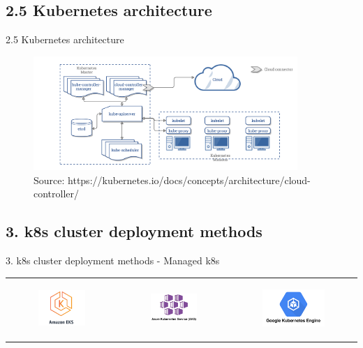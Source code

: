 \documentclass{beamer}
\begin{document}
\subsection{2.5 Kubernetes architecture}
\begin{frame}{2.5 Kubernetes architecture}%
\begin{figure}
	\includegraphics[width=10cm]{figures/k8s-arch.png}
	\label{fig:k8s-arch}
	\tiny{Source: https://kubernetes.io/docs/concepts/architecture/cloud-controller/}
\end{figure}
\end{frame}

\subsection{3. k8s cluster deployment methods}
\begin{frame}{3. k8s cluster deployment methods - Managed k8s}%
\begin{center}
	\begin{tabular}{ c c c}
		\begin{figure}
			\includegraphics[width=3cm]{figures/managed-aws-eks.png}
			\label{fig:managed-aws-eks}
		\end{figure} &
		\begin{figure}
			\includegraphics[width=3cm]{figures/managed-azure-kubernetes-service-aks.png}
			\label{fig:managed-azure-kubernetes-service-aks}
		\end{figure} &
		\begin{figure}
			\includegraphics[width=4cm]{figures/managed-gcp-gke.png}
			\label{fig:managed-gcp-gke}
		\end{figure}
	\end{tabular}
\end{center}
\end{frame}
\end{document}
